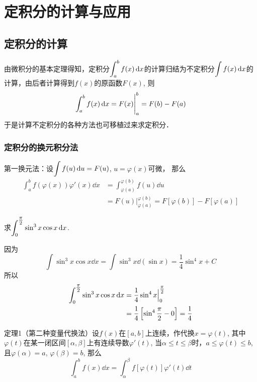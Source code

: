 \section{定积分的计算与应用}

\subsection{定积分的计算}

由微积分的基本定理得知，定积分$\displaystyle\int^b_a f(x)\,{\rm d} x$的计算归结为不定积分$\displaystyle\int f(x)\,{\rm d} x$的计算，由后者计算得到$f(x)$的原函数$F(x)$, 则
\[\displaystyle\int^b_a f(x)\,{\rm d} x=F (x)\Bigg|^b_a=F (b) -F (a)\] 
于是计算不定积分的各种方法也可移植过来求定积分．

\subsubsection{定积分的换元积分法}

第一换元法：设$\displaystyle\int f(u)\,{\rm d} u=F(u)$, $u=\varphi(x)$可微，
那么
\[\begin{split}
    \int^b_a f(\varphi(x))\varphi'(x)\dd x&=\int^{\varphi(b)}_{\varphi(a)}f(u)\dd u\\
    &=F(u)\Big|^{\varphi(b)}_{\varphi(a)}=F[{\varphi(b)}]-F[{\varphi(a)}]
\end{split}\]

\begin{example}
    求$\displaystyle\int^{\tfrac{\pi}{2}}_0 \sin^3x \cos x\,{\rm d} x$.
\end{example}

\begin{solution}
    因为
\[\int \sin^3x\cos x\dd x= \int \sin^3x\dd (\sin x) =\frac{1}{4}\sin^4x+C\]
所以
\[\begin{split}
    \displaystyle\int^{\tfrac{\pi}{2}}_0 \sin^3x \cos x\,{\rm d} x&=\dfrac{1}{4}\sin^4 x\Big|^{\tfrac{\pi}{2}}_0 \\
    &=\dfrac{1}{4}\left[\sin^4\dfrac{\pi}{2}-0\right]=\dfrac{1}{4}
\end{split}\]
\end{solution}

\begin{blk}
 {定理1（第二种变量代换法）}设$f(x)$在$[a,b]$上连续，作代换$x=\varphi (t)$, 其中$\varphi (t)$在某一闭区间$[\alpha,\beta]$上有连续导数$\varphi '(t)$, 当$\alpha\le t\le \beta$时，$a\le \varphi (t)\le b$, 且$\varphi (\alpha)=a$, $\varphi (\beta)=b$, 那么
\[\int^b_a f(x) \dd x= \int^{\beta}_{\alpha} f [\varphi  (t) ] \varphi ' (t) \dd t\]   
\end{blk}

